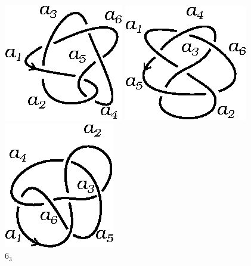 \documentclass[graybox]{svmult}
\begin{document}
\begin{figure}[ht]
		\centering
		\begin{minipage}{0.3\textwidth}
			\centering
		    \includegraphics[scale=0.6]{images/6_1}
			\caption{$6_1$}
			\label{fig:6_1}
		\end{minipage}
		\begin{minipage}{0.3\textwidth}
			\centering
		    \includegraphics[scale=0.6]{images/6_2}
			\caption{$6_2$}
			\label{fig:6_2}
		\end{minipage}
		\begin{minipage}{0.3\textwidth}
			\centering
		    \includegraphics[scale=0.6]{images/6_3}
			\caption{$6_3$}
			\label{fig:6_3}
		\end{minipage}
	\end{figure}
\end{document}
